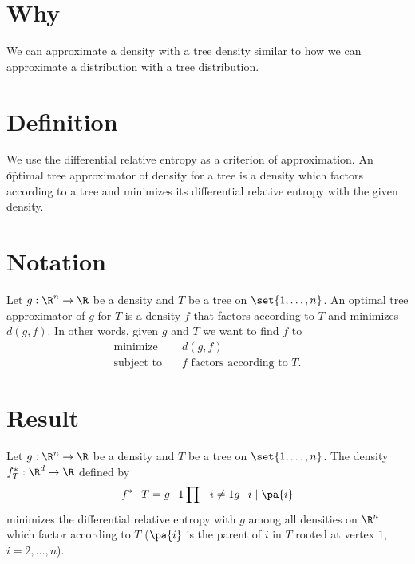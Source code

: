 

\section*{Why}

We can approximate a density with a tree density similar to how we can approximate a distribution with a tree distribution.

\section*{Definition}

We use the differential relative entropy as a criterion of approximation.
An \t{optimal tree approximator} of density for a tree is a density which factors according to a tree and minimizes its differential relative entropy with the given density.

\section*{Notation}

Let $g: \R ^n \to \R $ be a density and $T$ be a tree on $\set{1, \dots , n}$.
An optimal tree approximator of $g$ for $T$ is a density $f$ that factors according to $T$ and minimizes $d(g, f)$.
In other words, given $g$ and $T$ we want to find $f$ to
\[
\begin{aligned}
\text{minimize} &\quad d(g, f) \\
\text{subject to} &\quad f \text{ factors according to } T.
\end{aligned}
\]
  \section*{Result}


\begin{proposition}
Let $g: \R ^n \to \R $ be a density and $T$ be a tree on $\set{1, \dots , n}$.
The density $f^*_T: \R ^d \to \R $ defined by
$$
f^*\_T = g\_1 \prod\_{i \neq 1} g\_{i \mid \pa{i}}
$$
minimizes the differential relative entropy with $g$ among all densities on $\R ^n$ which factor according to $T$ ($\pa{i}$ is the parent of $i$ in $T$ rooted at vertex $1$, $i = 2, \dots , n$).

\end{proposition}

